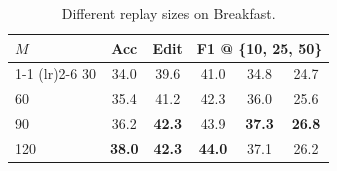 \begin{table}[!h]
\centering
\begin{tabular}{lccccc}
\toprule
$M$ & Acc &Edit & \multicolumn{3}{c}{F1 @ \{10, 25, 50\}} \\ \cmidrule(lr){1-1} \cmidrule(lr){2-6}
30 &  34.0 &  39.6 &  41.0 &  34.8 & 24.7 \\ 
\rowcolor{gray!30}
60 &  35.4 &  41.2 &  42.3 &  36.0 & 25.6 \\ 
90 &  36.2 &  \textbf{42.3} &  43.9 &  \textbf{37.3} & \textbf{26.8} \\ 
120 &  \textbf{38.0} &  \textbf{42.3} &  \textbf{44.0} &  37.1 & 26.2 \\ \bottomrule
\end{tabular}
\caption{Different replay sizes on Breakfast.%
}
\label{tab:mem}
\end{table}